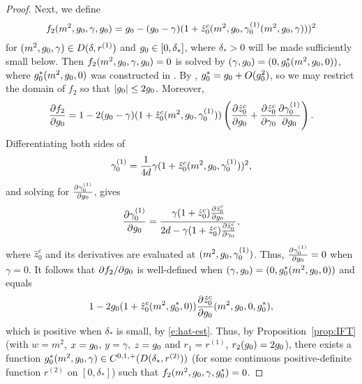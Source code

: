 \begin{proof}
Next, we define
\begin{equation}
f_2(m^2, g_0, \gamma, g_0)
	=
g_0 - (g_0 - \gamma) (1 + \hat z_0^c(m^2, g_0, \gamma^{(1)}_0(m^2, g_0, \gamma)))^2
\end{equation}
for $(m^2, g_0, \gamma) \in D(\delta, r^{(1)})$ and $g_0 \in [0, \delta_*]$,
where $\delta_* > 0$ will be made sufficiently small below.
Then $f_2(m^2, g_0, \gamma, g_0) = 0$ is solved by
$(\gamma, g_0) = (0, g_0^*(m^2, g_0, 0))$,
where $g_0^*(m^2, g_0, 0)$ was constructed in \cite[\eqref{log-e:ccstar2}]{BBS-saw4-log}.
By \cite[\eqref{log-e:gznustarbd}]{BBS-saw4-log}, $g_0^* = g_0 + O(g_0^2)$,
so we may restrict the domain of $f_2$ so that $|g_0| \le 2 g_0$.
Moreover,
\begin{equation}
\frac{\partial f_2}{\partial g_0}
	=
1 - 2 (g_0 - \gamma) (1 + \hat z_0^c(m^2, g_0, \gamma^{(1)}_0))
\left( \frac{\partial \hat z_0^c}{\partial g_0} + \frac{\partial \hat z_0^c}{\partial \gamma_0} \frac{\partial \gamma^{(1)}_0}{\partial g_0} \right).
\end{equation}
Differentiating both sides of
\begin{equation}
\gamma^{(1)}_0
	=
\frac{1}{4d} \gamma (1 + \hat z_0^c(m^2, g_0, \gamma^{(1)}_0))^2,
\end{equation}
and solving for $\frac{\partial \gamma^{(1)}_0}{\partial g_0}$, gives
\begin{equation}
\frac{\partial \gamma^{(1)}_0}{\partial g_0}
	=
\frac{\gamma (1 + \hat z_0^c)
	\frac{\partial \hat z_0^c}{\partial g_0}}{2 d - \gamma (1 + \hat z_0^c) \frac{\partial \hat z_0^c}{\partial \gamma_0}},
\end{equation}
where $\hat z_0^c$ and its derivatives are evaluated at $(m^2, g_0, \gamma^{(1)}_0)$.
Thus, $\frac{\partial \gamma^{(1)}_0}{\partial g_0} = 0$ when $\gamma = 0$.
It follows that $\partial f_2/\partial g_0$
is well-defined when $(\gamma, g_0) = (0, g_0^*(m^2, g_0, 0))$ and equals
\begin{equation}
1 - 2 g_0 (1 + \hat z_0^c(m^2, g_0^*, 0)) \frac{\partial \hat z_0^c}{\partial g_0}(m^2, g_0, 0, g_0^*),
\end{equation}
which is positive when $\delta_*$ is small, by \eqref{e:hat-est}.
Thus, by Proposition~\ref{prop:IFT}
(with $w = m^2$, $x = g_0$, $y = \gamma$, $z = g_0$ and $r_1 = r^{(1)}$, $r_2(g_0) = 2g_0$),
there exists a function $g_0^*(m^2, g_0, \gamma) \in C^{0,1,+}(D(\delta_*, r^{(2)}))$
(for some continuous positive-definite function $r^{(2)}$ on $[0, \delta_*]$)
such that $f_2(m^2, g_0, \gamma, g_0^*) = 0$.


\end{proof}
